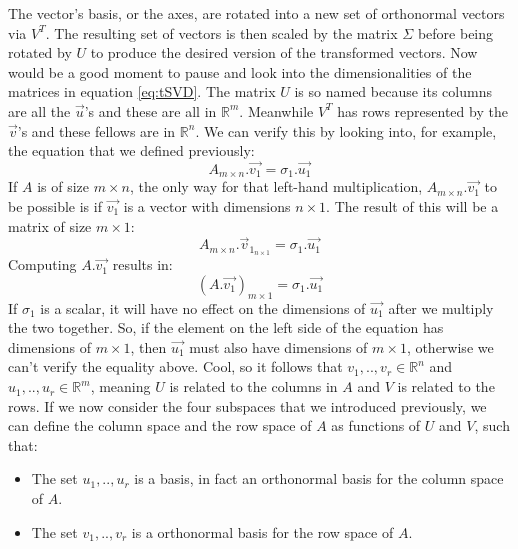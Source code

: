 \documentclass[600paper, 11pt,twoside,openany]{kdp}
\begin{document}
The vector’s basis, or the axes, are rotated into a new set of orthonormal vectors via $V^T$. The resulting set of vectors is then scaled by the matrix $\Sigma$ before being rotated by $U$ to produce the desired version of the transformed vectors. Now would be a good moment to pause and look into the dimensionalities of the matrices in equation \ref{eq:tSVD}. The matrix $U$ is so named because its columns are all the $\overrightarrow{u}$’s and these are all in $\mathbb{R}^m$. Meanwhile $V^T$ has rows represented by the $\overrightarrow{v}$’s and these fellows are in $\mathbb{R}^n$. We can verify this by looking into, for example, the equation that we defined previously:
\[A_{m \times n}.\overrightarrow{v_1} = \sigma_1.\overrightarrow{u_1}\]
\indent If $A$ is of size $m \times n$, the only way for that left-hand multiplication,  $A_{m \times n}.\overrightarrow{v_1}$ to be possible is if $\overrightarrow{v_1}$ is a vector with dimensions $n \times 1$. The result of this will be a matrix of size $m \times 1$:
\[ A_{m \times n}.\overrightarrow{v}_{1_{n \times 1}} = \sigma_1.\overrightarrow{u_1} \]
\indent Computing $A.\overrightarrow{v_1}$ results in:
\[\left(A.\overrightarrow{v_1} \right)_{m \times 1} = \sigma_1.\overrightarrow{u_1} \]
\indent If $\sigma_1$ is a scalar, it will have no effect on the dimensions of $\overrightarrow{u_1}$ after we multiply the two together. So, if the element on the left side of the equation has dimensions of $m \times 1$, then $\overrightarrow{u_1}$ must also have dimensions of $m \times 1$, otherwise we can’t verify the equality above. Cool, so it follows that $v_1,..,v_r \in \mathbb{R}^n$ and $u_1,..,u_r \in \mathbb{R}^m$, meaning $U$ is related to the columns in $A$ and $V$ is related to the rows. If we now consider the four subspaces that we introduced previously, we can define the column space and the row space of $A$ as functions of $U$ and $V$, such that: 
\begin{tcolorbox}
\begin{itemize}
\item The set $u_1,..,u_r$ is a basis, in fact an orthonormal basis for the column space of $A$.
\item The set $v_1,..,v_r$ is a orthonormal basis for the row space of $A$.
\end{itemize}
\end{tcolorbox}
\end{document}
